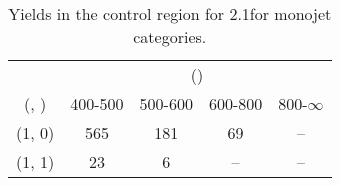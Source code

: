 \begin{table}[h!]
\tiny
\centering
\caption{Yields in the \gj control region for 2.1\ifb for monojet categories.\label{tab:yieldssep_gj_data_mono}}
\begin{tabular}
{ccccc}
	\hline\hline
	& \multicolumn{4}{c}{\scalht (\gev)} \\ 
	 (\njet,  \nb) & 400-500 & 500-600 & 600-800 & 800-$\infty$ \\ [0.8ex] 
\hline
	(1, 0) & 565 & 181 & 69 & -- \\[0.5ex] 
	(1, 1) & 23 & 6 & -- & -- \\[0.5ex] 
	\hline
	\hline
\end{tabular}
\end{table}
